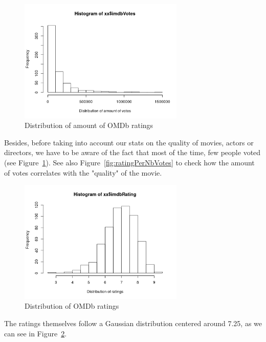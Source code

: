 \begin{figure}[!ht]
\begin{center}
\includegraphics[width=0.70\textwidth]{../src/pre-processing/stats/results/distNbVotes.png}
\end{center}
\caption{Distribution of amount of OMDb ratings}
\label{fig:distNbVotes}
\end{figure}
Besides, before taking into account our stats on the quality of movies, actors or directors, we have to be aware of the fact that most of the time, few people voted (see Figure~\ref{fig:distNbVotes}).
See also Figure~\ref{fig:ratingPerNbVotes} to check how the amount of votes correlates with the "quality" of the movie.

\begin{figure}[!ht]
\begin{center}
\includegraphics[width=0.70\textwidth]{../src/pre-processing/stats/results/distRatings.png}
\end{center}
\caption{Distribution of OMDb ratings}
\label{fig:distRatings}
\end{figure}
The ratings themselves follow a Gaussian distribution centered around 7.25, as we can see in Figure~\ref{fig:distRatings}.


